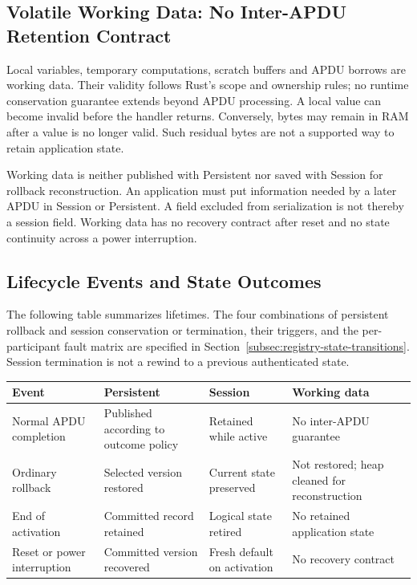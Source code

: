 \subsection{Volatile Working Data: No Inter-APDU Retention Contract}

Local variables, temporary computations, scratch buffers and APDU borrows are
working data. Their validity follows Rust's scope and ownership rules; no
runtime conservation guarantee extends beyond APDU processing. A local value
can become invalid before the handler returns. Conversely, bytes may remain
in RAM after a value is no longer valid. Such residual bytes are not a
supported way to retain application state.

Working data is neither published with Persistent nor saved with Session for
rollback reconstruction. An application must put information needed by a
later APDU in Session or Persistent. A field excluded from serialization is
not thereby a session field. Working data has no recovery contract after
reset and no state continuity across a power interruption.

\subsection{Lifecycle Events and State Outcomes}

The following table summarizes lifetimes. The four combinations of
persistent rollback and session conservation or termination, their triggers,
and the per-participant fault matrix are specified in
Section~\ref{subsec:registry-state-transitions}. Session termination is not
a rewind to a previous authenticated state.

\begin{center}
\small
\renewcommand{\arraystretch}{1.2}
\begin{tabular}{|>{\raggedright\arraybackslash}p{2.8cm}|>{\raggedright\arraybackslash}p{3.4cm}|>{\raggedright\arraybackslash}p{3.4cm}|>{\raggedright\arraybackslash}p{3.4cm}|}
\hline
Event & Persistent & Session & Working data \\
\hline
Normal APDU completion & Published according to outcome policy & Retained
while active & No inter-APDU guarantee \\
\hline
Ordinary rollback & Selected version restored & Current state preserved &
Not restored; heap cleaned for reconstruction \\
\hline
End of activation & Committed record retained & Logical state retired &
No retained application state \\
\hline
Reset or power interruption & Committed version recovered & Fresh default
on activation & No recovery contract \\
\hline
\end{tabular}
\end{center}

